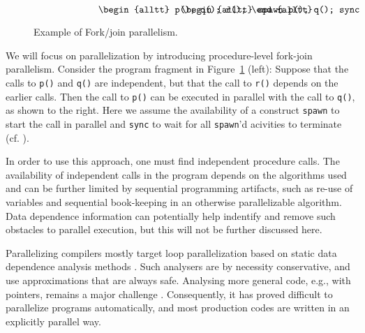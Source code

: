 \documentclass{acm_proc_article-sp}
\begin{document}
\begin{figure}
\small
\hrulefill
\[
\begin{minipage}[t]{3cm}
\begin{alltt}
   p();
   q();
   r();
\end{alltt}
\end{minipage}
\begin{minipage}[t]{3cm}
\begin{alltt}
   spawn p();
   q();
   sync;
   r();
\end{alltt}
\end{minipage} 
\]
\hrulefill
\caption{Example of Fork/join parallelism.}
\label{fforkjoin}
\end{figure}

We will focus on parallelization by introducing procedure-level
fork-join parallelism.  Consider the program fragment in
Figure~\ref{fforkjoin} (left):
Suppose that the calls to {\tt p()} and {\tt q()} are independent,
but that the call to {\tt r()} depends on the earlier calls. Then
the call to {\tt p()} can be
executed in parallel with
the call to {\tt q()}, as shown to the right.
Here we assume the availability of a construct {\tt spawn} to start
the call in parallel and {\tt sync} to wait for all {\tt spawn}'d
acivities to terminate (cf. \cite{BJKLR96,frigo98implementation}).

In order to use this approach, one must find independent
procedure calls.  The availability of independent
calls in the program depends on the algorithms used and can be further
limited by sequential programming artifacts, such as re-use of
variables and sequential book-keeping in an otherwise parallelizable
algorithm.  Data dependence information can potentially help
indentify and remove such obstacles to parallel execution, but this
will not be further discussed here.

Parallelizing compilers mostly target loop parallelization based on
static data dependence analysis methods \cite{}.  Such analysers are
by necessity conservative, and use
approximations that are always safe.  
Analysing more general code, e.g., with pointers, remains a major
challenge \cite{}.  Consequently, it has proved difficult to
parallelize programs automatically, and most production
codes are written in an explicitly parallel way.
\end{document}
